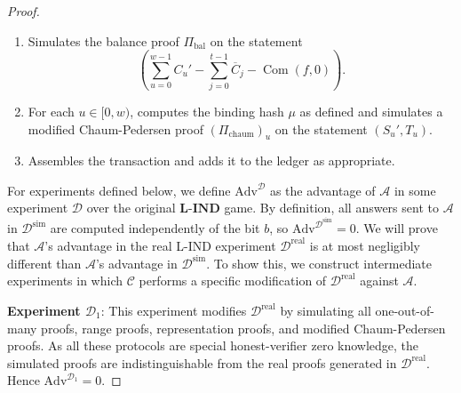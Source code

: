 \documentclass{llncs}
\newcommand{\com}{\operatorname{Com}}
\begin{document}
\begin{proof}
\begin{itemize}
\begin{enumerate}
\begin{enumerate}
\begin{enumerate}
                \item Simulates the value encryption by selecting random $\widetilde{v}$ of the proper length, and encrypting it to produce $$\text{AEADEncrypt}(k_{\text{enc}},\texttt{val},\widetilde{v}) \to \overline{v}_j.$$
                \item Simulates the memo encryption by selecting random $\widetilde{m}$ of the proper length, and encrypting it to produce $$\text{AEADEncrypt}(k_{\text{enc}},\texttt{memo},\widetilde{m}) \to \overline{m}_j.$$
                \item Simulates a range proof $(\Pi_{\text{rp}})_j$ on the statement $(\overline{C}_j)$.
            \end{enumerate}
        \end{enumerate}
        \item Simulates the balance proof $\Pi_{\text{bal}}$ on the statement $$\left(\sum_{u=0}^{w-1} C_u' - \sum_{j=0}^{t-1} \overline{C}_j - \com(f,0)\right).$$
        \item For each $u \in [0,w)$, computes the binding hash $\mu$ as defined and simulates a modified Chaum-Pedersen proof $(\Pi_{\text{chaum}})_u$ on the statement $(S_u', T_u)$.
        \item Assembles the transaction and adds it to the ledger as appropriate.
    \end{enumerate}
\end{itemize}

For experiments defined below, we define $\text{Adv}^{\mathcal{D}}$ as the advantage of $\mathcal{A}$ in some experiment $\mathcal{D}$ over the original $\textbf{L-IND}$ game.
By definition, all answers sent to $\mathcal{A}$ in $\mathcal{D}^{\text{sim}}$ are computed independently of the bit $b$, so $\text{Adv}^{\mathcal{D}^{\text{sim}}} = 0$. We will prove that $\mathcal{A}$'s advantage in the real L-IND experiment $\mathcal{D}^{\text{real}}$ is at most negligibly different than $\mathcal{A}$'s advantage in $\mathcal{D}^{\text{sim}}$.
To show this, we construct intermediate experiments in which $\mathcal{C}$ performs a specific modification of $\mathcal{D}^{\text{real}}$ against $\mathcal{A}$.

\textbf{Experiment $\mathcal{D}_1$}: This experiment modifies $\mathcal{D}^{\text{real}}$ by simulating all one-out-of-many proofs, range proofs, representation proofs, and modified Chaum-Pedersen proofs.
As all these protocols are special honest-verifier zero knowledge, the simulated proofs are indistinguishable from the real proofs generated in $\mathcal{D}^{\text{real}}$.
Hence $\text{Adv}^{\mathcal{D}_1} = 0$.


\end{proof}
\end{document}

